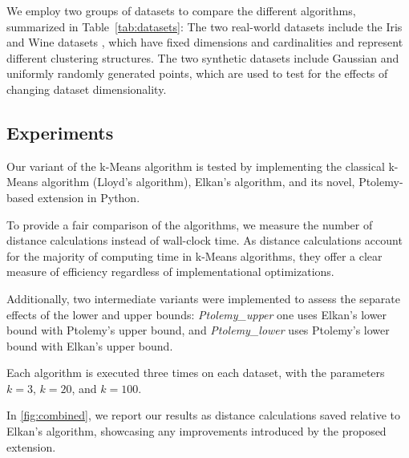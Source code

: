 We employ two groups of datasets to compare the different algorithms, summarized in Table~\ref{tab:datasets}:
The two real-world datasets include the Iris and Wine datasets \cite{pedregosa2011scikit}, which have fixed dimensions and cardinalities and represent different clustering structures.
The two synthetic datasets include Gaussian and uniformly randomly generated points, which are used to test for the effects of changing dataset dimensionality.

\subsection{Experiments}
Our variant of the k-Means algorithm is tested by implementing the classical k-Means algorithm (Lloyd's algorithm), Elkan's algorithm, and its novel, Ptolemy-based extension in Python.

To provide a fair comparison of the algorithms,
we measure the number of distance calculations instead of wall-clock time.
As distance calculations account for the majority of computing time in k-Means algorithms, they offer a clear measure of efficiency regardless of implementational optimizations.

Additionally, two intermediate variants were implemented to assess the separate effects of the lower and upper bounds:
\emph{Ptolemy\_upper} one uses Elkan's lower bound with Ptolemy's upper bound, and \emph{Ptolemy\_lower} uses Ptolemy's lower bound with Elkan's upper bound.

Each algorithm is executed three times on each dataset, with the parameters $k = 3$, $k = 20$, and $k = 100$.

In \autoref{fig:combined}, we report our results as distance calculations saved relative to Elkan's algorithm, showcasing any improvements introduced by the proposed extension.



